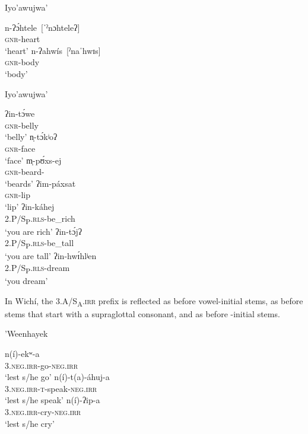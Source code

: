 \ea\label{ex:sylln:1b:i'w}
    Iyo'awujwa'
    \begin{xlist}
        \ex\gll n-ʔɔ́htele~[ˈˀnɔhteleʔ]\\
                {\textsc{gnr}}-heart\\
                \glt `heart'        
        \ex\gll n-ʔahwís~[ˀnaˈhwɪs]\\
                {\textsc{gnr}}-body\\
                \glt `body'
    \end{xlist}
\z

\ea\label{ex:sylln:2:i'w}
    Iyo'awujwa' \citep[69, 77]{AG83}
    \begin{xlist}
        \ex\gll ʔin-tɔ́we\\
                {\textsc{gnr}}-belly\\
                \glt `belly'
        \ex\gll n̩-tɔ́kʲoʔ\\
                {\textsc{gnr}}-face\\
                \glt `face'
        \ex\gll m̩-pʊ́xs-ej\\
                {\textsc{gnr}}-beard-\PL\\
                \glt `beards'
        \ex\gll ʔim-páxsat\\
                {\textsc{gnr}}-lip\\
                \glt `lip'
        \ex\gll ʔin-káhej\\
                2.P/S\textsubscript{P}.{\textsc{rls}}-be\_rich\\
                \glt `you are rich'
        \ex\gll ʔin-tɔ́jʔ\\
                2.P/S\textsubscript{P}.{\textsc{rls}}-be\_tall\\
                \glt `you are tall'
        \ex\gll ʔin-hwɪ́hlʲen\\
                2.P/S\textsubscript{P}.{\textsc{rls}}-dream\\
                \glt `you dream'
    \end{xlist}
\z

In Wichí, the 3.A/S\textsubscript{A}.{\textsc{irr}} prefix is reflected as  before vowel-initial stems, as  before stems that start with a supraglottal consonant, and as  before \mbox{-}initial stems.

\newpage
\ea\label{ex:sylln:whk}
    'Weenhayek \citep[125, 544]{KC16}
    \begin{xlist}
        \ex \gll n(í)-ekʷ-a~\\
                3.\textsc{neg.irr}-go-\textsc{neg.irr}\\
                \glt `lest s/he go'
        \ex \gll n(í)-t(a)-áhuj-a~\\
                3.\textsc{neg.irr-t}-speak-\textsc{neg.irr}\\
                \glt `lest s/he speak'
        \ex \gll n(í)-ʔip-a~\\
                3.\textsc{neg.irr}-cry-\textsc{neg.irr}\\
                \glt `lest s/he cry'
    \end{xlist}
\z

